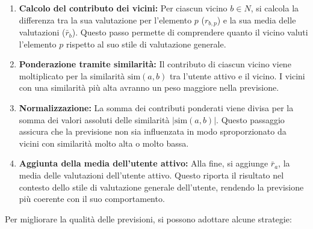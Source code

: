 \documentclass{report}
\begin{document}
	\begin{enumerate}
		\item \textbf{Calcolo del contributo dei vicini:}  
		Per ciascun vicino \(b \in N\), si calcola la differenza tra la sua valutazione per l'elemento \(p\) (\(r_{b,p}\)) e la sua media delle valutazioni (\(\bar{r}_b\)). Questo passo permette di comprendere quanto il vicino valuti l'elemento \(p\) rispetto al suo stile di valutazione generale.
		
		\item \textbf{Ponderazione tramite similarità:}  
		Il contributo di ciascun vicino viene moltiplicato per la similarità \(\text{sim}(a, b)\) tra l'utente attivo e il vicino. I vicini con una similarità più alta avranno un peso maggiore nella previsione.
		
		\item \textbf{Normalizzazione:}  
		La somma dei contributi ponderati viene divisa per la somma dei valori assoluti delle similarità \(|\text{sim}(a, b)|\). Questo passaggio assicura che la previsione non sia influenzata in modo sproporzionato da vicini con similarità molto alta o molto bassa.
		
		\item \textbf{Aggiunta della media dell'utente attivo:}  
		Alla fine, si aggiunge \(\bar{r}_a\), la media delle valutazioni dell'utente attivo. Questo riporta il risultato nel contesto dello stile di valutazione generale dell'utente, rendendo la previsione più coerente con il suo comportamento.
	\end{enumerate}
	Per migliorare la qualità delle previsioni, si possono adottare alcune strategie:
\end{document}
